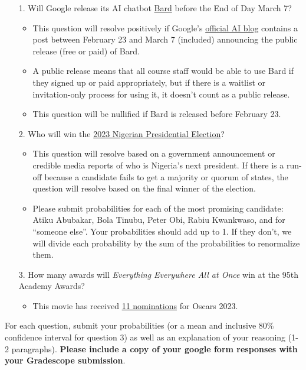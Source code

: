 \documentclass[11pt]{article}
\begin{document}
\begin{enumerate}
	\item[1.] Will Google release its AI chatbot \href{https://blog.google/technology/ai/bard-google-ai-search-updates/}{Bard} before the End of Day March 7?
	\begin{itemize}
		\item This question will resolve positively if Google's \href{https://blog.google/technology/ai/}{official AI blog} contains a post between February 23 and March 7 (included) announcing the public release (free or paid) of Bard. 
        \item A public release means that all course staff would be able to use Bard if they signed up or paid appropriately, but if there is a waitlist or invitation-only process for using it, it doesn't count as a public release. 
        \item This question will be nullified if Bard is released before February 23.
	\end{itemize} 
	\item[2.] Who will win the \href{https://www.bbc.com/news/world-africa-64496042}{2023 Nigerian Presidential Election}?
	\begin{itemize}
		\item This question will resolve based on a government announcement or credible media reports of who is Nigeria's next president. If there is a run-off because a candidate fails to get a majority or quorum of states, the question will resolve based on the final winner of the election. 
        \item Please submit probabilities for each of the most promising candidate: Atiku Abubakar, Bola Tinubu, Peter Obi, Rabiu Kwankwaso, and for ``someone else''. Your probabilities should add up to 1. If they don't, we will divide each probability by the sum of the probabilities to renormalize them.
    \end{itemize}

	\item[3.] How many awards will \emph{Everything Everywhere All at Once} win at the 95th Academy Awards?
	\begin{itemize}
		\item This movie has received \href{https://www.imdb.com/title/tt6710474/awards/}{11 nominations} for Oscars 2023.  
	\end{itemize} 
\end{enumerate}

For each question, submit your probabilities (or a mean and inclusive 80\% confidence interval for question 3) as well as an explanation of your reasoning (1-2 paragraphs). \textbf{Please include a copy of your google form responses with your Gradescope submission}. 
\end{document}
